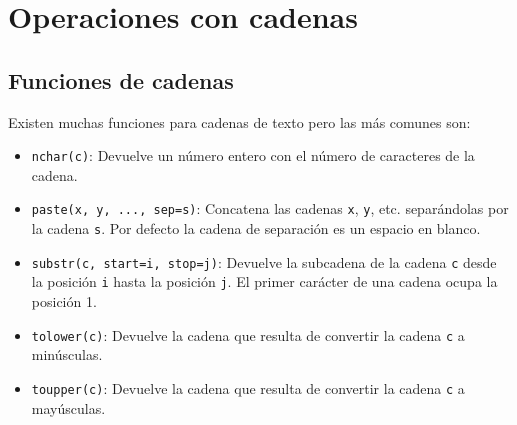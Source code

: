 \documentclass[
]{book}
\providecommand{\tightlist}{%
  \setlength{\itemsep}{0pt}\setlength{\parskip}{0pt}}
\theoremstyle{definition}
\theoremstyle{definition}
\theoremstyle{definition}
\theoremstyle{definition}
\theoremstyle{remark}
\begin{document}
\hypertarget{operaciones-con-cadenas}{%
\section{Operaciones con cadenas}\label{operaciones-con-cadenas}}

\hypertarget{funciones-de-cadenas}{%
\subsection{Funciones de cadenas}\label{funciones-de-cadenas}}

Existen muchas funciones para cadenas de texto pero las más comunes son:

\begin{itemize}
\tightlist
\item
  \texttt{nchar(c)}: Devuelve un número entero con el número de caracteres de la cadena.
\item
  \texttt{paste(x,\ y,\ ...,\ sep=s)}: Concatena las cadenas \texttt{x}, \texttt{y}, etc. separándolas por la cadena \texttt{s}. Por defecto la cadena de separación es un espacio en blanco.
\item
  \texttt{substr(c,\ start=i,\ stop=j)}: Devuelve la subcadena de la cadena \texttt{c} desde la posición \texttt{i} hasta la posición \texttt{j}. El primer carácter de una cadena ocupa la posición 1.
\item
  \texttt{tolower(c)}: Devuelve la cadena que resulta de convertir la cadena \texttt{c} a minúsculas.
\item
  \texttt{toupper(c)}: Devuelve la cadena que resulta de convertir la cadena \texttt{c} a mayúsculas.
\end{itemize}
\end{document}
